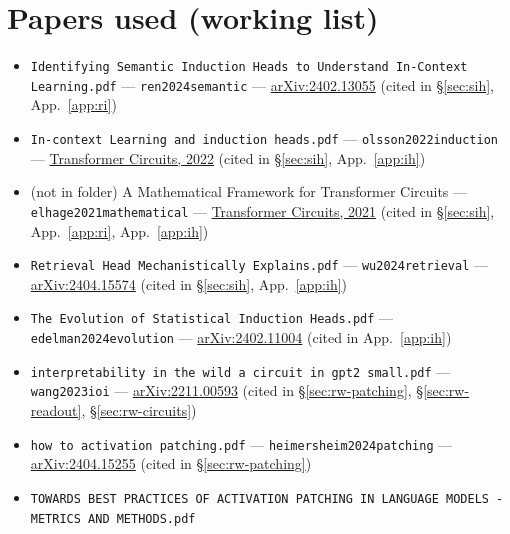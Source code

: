 
\section*{Papers used (working list)}
\begin{itemize}\setlength\itemsep{0pt}\small
\item \texttt{Identifying Semantic Induction Heads to Understand In-Context Learning.pdf}
  --- \texttt{ren2024semantic} ---
  \href{https://arxiv.org/abs/2402.13055}{arXiv:2402.13055} (cited in \S\ref{sec:sih}, App.~\ref{app:ri})
\item \texttt{In-context Learning and induction heads.pdf}
  --- \texttt{olsson2022induction} ---
  \href{https://transformer-circuits.pub/2022/in-context-learning-and-induction-heads/index.html}{Transformer Circuits, 2022}
  (cited in \S\ref{sec:sih}, App.~\ref{app:ih})
\item (not in folder) A Mathematical Framework for Transformer Circuits
  --- \texttt{elhage2021mathematical} ---
  \href{https://transformer-circuits.pub/2021/framework/index.html}{Transformer Circuits, 2021}
  (cited in \S\ref{sec:sih}, App.~\ref{app:ri}, App.~\ref{app:ih})
\item \texttt{Retrieval Head Mechanistically Explains.pdf}
  --- \texttt{wu2024retrieval} ---
  \href{https://arxiv.org/abs/2404.15574}{arXiv:2404.15574} (cited in \S\ref{sec:sih}, App.~\ref{app:ih})
\item \texttt{The Evolution of Statistical Induction Heads.pdf}
  --- \texttt{edelman2024evolution} ---
  \href{https://arxiv.org/abs/2402.11004}{arXiv:2402.11004} (cited in App.~\ref{app:ih})
\item \texttt{interpretability in the wild a circuit in gpt2 small.pdf}
  --- \texttt{wang2023ioi} ---
  \href{https://arxiv.org/abs/2211.00593}{arXiv:2211.00593} (cited in \S\ref{sec:rw-patching}, \S\ref{sec:rw-readout}, \S\ref{sec:rw-circuits})
\item \texttt{how to activation patching.pdf}
  --- \texttt{heimersheim2024patching} ---
  \href{https://arxiv.org/abs/2404.15255}{arXiv:2404.15255} (cited in \S\ref{sec:rw-patching})
\item \texttt{TOWARDS BEST PRACTICES OF ACTIVATION PATCHING IN LANGUAGE MODELS - METRICS AND METHODS.pdf}

\end{itemize}
